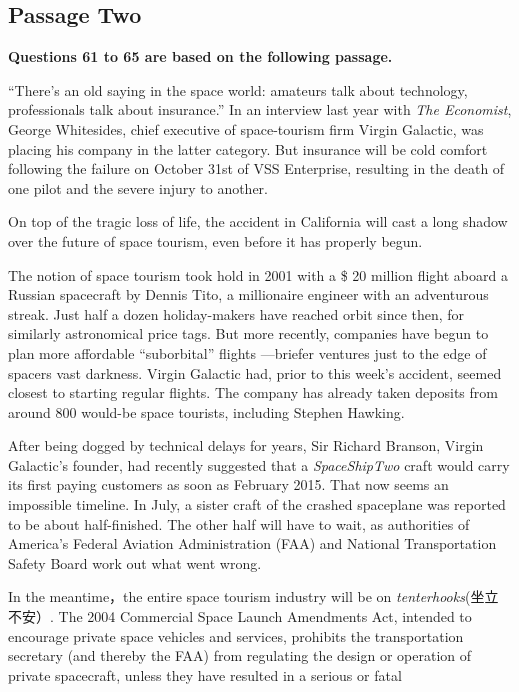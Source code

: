 \documentclass[UTF8,11pt]{ctexart}
\begin{document}
\subsection*{\textbf{Passage Two}}


\textbf{Questions 61 to 65 are based on the following passage.}


“There’s an old saying in the space world: amateurs talk about technology, professionals talk about insurance.” In an interview last year with\textit{ The Economist}, George Whitesides, chief executive of space-tourism firm Virgin Galactic, was placing his company in the latter category. But insurance will be cold comfort following the failure on October 31st of VSS Enterprise, resulting in the death of one pilot and the severe injury to another.


On top of the tragic loss of life, the accident in California will cast a long shadow over the future of space tourism, even before it has properly begun.


The notion of space tourism took hold in 2001 with a \$ 20 million flight aboard a Russian spacecraft by Dennis Tito, a millionaire engineer with an adventurous streak. Just half a dozen holiday-makers have reached orbit since then, for similarly astronomical price tags. But more recently, companies have begun to plan more affordable “suborbital” flights —briefer ventures just to the edge of spacers vast darkness. Virgin Galactic had, prior to this week’s accident, seemed closest to starting regular flights. The company has already taken deposits from around 800 would-be space tourists, including Stephen Hawking.


After being dogged by technical delays for years, Sir Richard Branson, Virgin Galactic’s founder, had recently suggested that a\textit{ SpaceShipTwo} craft would carry its first paying customers as soon as February 2015. That now seems an impossible timeline. In July, a sister craft of the crashed spaceplane was reported to be about half-finished. The other half will have to wait, as authorities of America’s Federal Aviation Administration (FAA) and National Transportation Safety Board work out what went wrong.


In the meantime，the entire space tourism industry will be on\textit{ tenterhooks}(坐立不安）. The 2004 Commercial Space Launch Amendments Act, intended to encourage private space vehicles and services, prohibits the transportation secretary (and thereby the FAA) from regulating the design or operation of private spacecraft, unless they have resulted in a serious or fatal
\end{document}
